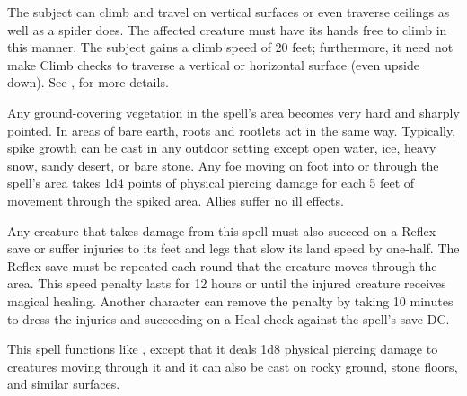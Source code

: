 \spelldur{\durmed}
\begin{spelleffect}
    The subject can climb and travel on vertical surfaces or even traverse ceilings as well as a spider does. The affected creature must have its hands free to climb in this manner. The subject gains a climb speed of 20 feet; furthermore, it need not make Climb checks to traverse a vertical or horizontal surface (even upside down). See , for more details.
\end{spelleffect}

\spellrng{\rngmed}
\begin{spelleffect}
  Any ground-covering vegetation in the spell's area becomes very hard and sharply pointed. In areas of bare earth, roots and rootlets act in the same way. Typically, spike growth can be cast in any outdoor setting except open water, ice, heavy snow, sandy desert, or bare stone. Any foe moving on foot into or through the spell's area takes 1d4 points of physical piercing damage for each 5 feet of movement through the spiked area. Allies suffer no ill effects.
  \par Any creature that takes damage from this spell must also succeed on a Reflex save or suffer injuries to its feet and legs that slow its land speed by one-half. The Reflex save must be repeated each round that the creature moves through the area. This speed penalty lasts for 12 hours or until the injured creature receives magical healing. Another character can remove the penalty by taking 10 minutes to dress the injuries and succeeding on a Heal check against the spell's save DC.
\end{spelleffect}

\begin{spelleffect}
  This spell functions like , except that it deals 1d8 physical piercing damage to creatures moving through it and it can also be cast on rocky ground, stone floors, and similar surfaces.
\end{spelleffect}

